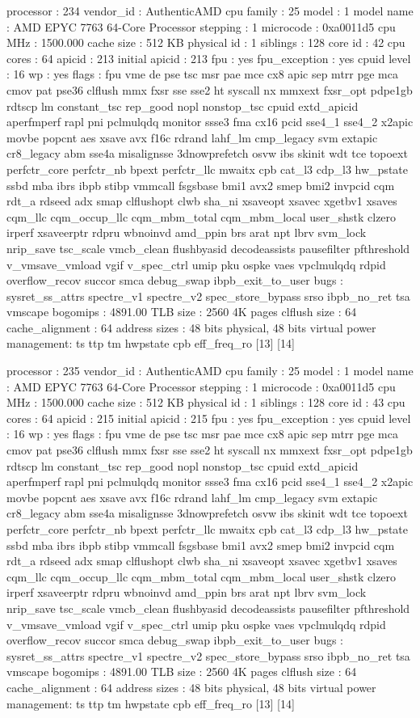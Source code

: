 processor	: 234
vendor_id	: AuthenticAMD
cpu family	: 25
model		: 1
model name	: AMD EPYC 7763 64-Core Processor
stepping	: 1
microcode	: 0xa0011d5
cpu MHz		: 1500.000
cache size	: 512 KB
physical id	: 1
siblings	: 128
core id		: 42
cpu cores	: 64
apicid		: 213
initial apicid	: 213
fpu		: yes
fpu_exception	: yes
cpuid level	: 16
wp		: yes
flags		: fpu vme de pse tsc msr pae mce cx8 apic sep mtrr pge mca cmov pat pse36 clflush mmx fxsr sse sse2 ht syscall nx mmxext fxsr_opt pdpe1gb rdtscp lm constant_tsc rep_good nopl nonstop_tsc cpuid extd_apicid aperfmperf rapl pni pclmulqdq monitor ssse3 fma cx16 pcid sse4_1 sse4_2 x2apic movbe popcnt aes xsave avx f16c rdrand lahf_lm cmp_legacy svm extapic cr8_legacy abm sse4a misalignsse 3dnowprefetch osvw ibs skinit wdt tce topoext perfctr_core perfctr_nb bpext perfctr_llc mwaitx cpb cat_l3 cdp_l3 hw_pstate ssbd mba ibrs ibpb stibp vmmcall fsgsbase bmi1 avx2 smep bmi2 invpcid cqm rdt_a rdseed adx smap clflushopt clwb sha_ni xsaveopt xsavec xgetbv1 xsaves cqm_llc cqm_occup_llc cqm_mbm_total cqm_mbm_local user_shstk clzero irperf xsaveerptr rdpru wbnoinvd amd_ppin brs arat npt lbrv svm_lock nrip_save tsc_scale vmcb_clean flushbyasid decodeassists pausefilter pfthreshold v_vmsave_vmload vgif v_spec_ctrl umip pku ospke vaes vpclmulqdq rdpid overflow_recov succor smca debug_swap ibpb_exit_to_user
bugs		: sysret_ss_attrs spectre_v1 spectre_v2 spec_store_bypass srso ibpb_no_ret tsa vmscape
bogomips	: 4891.00
TLB size	: 2560 4K pages
clflush size	: 64
cache_alignment	: 64
address sizes	: 48 bits physical, 48 bits virtual
power management: ts ttp tm hwpstate cpb eff_freq_ro [13] [14]

processor	: 235
vendor_id	: AuthenticAMD
cpu family	: 25
model		: 1
model name	: AMD EPYC 7763 64-Core Processor
stepping	: 1
microcode	: 0xa0011d5
cpu MHz		: 1500.000
cache size	: 512 KB
physical id	: 1
siblings	: 128
core id		: 43
cpu cores	: 64
apicid		: 215
initial apicid	: 215
fpu		: yes
fpu_exception	: yes
cpuid level	: 16
wp		: yes
flags		: fpu vme de pse tsc msr pae mce cx8 apic sep mtrr pge mca cmov pat pse36 clflush mmx fxsr sse sse2 ht syscall nx mmxext fxsr_opt pdpe1gb rdtscp lm constant_tsc rep_good nopl nonstop_tsc cpuid extd_apicid aperfmperf rapl pni pclmulqdq monitor ssse3 fma cx16 pcid sse4_1 sse4_2 x2apic movbe popcnt aes xsave avx f16c rdrand lahf_lm cmp_legacy svm extapic cr8_legacy abm sse4a misalignsse 3dnowprefetch osvw ibs skinit wdt tce topoext perfctr_core perfctr_nb bpext perfctr_llc mwaitx cpb cat_l3 cdp_l3 hw_pstate ssbd mba ibrs ibpb stibp vmmcall fsgsbase bmi1 avx2 smep bmi2 invpcid cqm rdt_a rdseed adx smap clflushopt clwb sha_ni xsaveopt xsavec xgetbv1 xsaves cqm_llc cqm_occup_llc cqm_mbm_total cqm_mbm_local user_shstk clzero irperf xsaveerptr rdpru wbnoinvd amd_ppin brs arat npt lbrv svm_lock nrip_save tsc_scale vmcb_clean flushbyasid decodeassists pausefilter pfthreshold v_vmsave_vmload vgif v_spec_ctrl umip pku ospke vaes vpclmulqdq rdpid overflow_recov succor smca debug_swap ibpb_exit_to_user
bugs		: sysret_ss_attrs spectre_v1 spectre_v2 spec_store_bypass srso ibpb_no_ret tsa vmscape
bogomips	: 4891.00
TLB size	: 2560 4K pages
clflush size	: 64
cache_alignment	: 64
address sizes	: 48 bits physical, 48 bits virtual
power management: ts ttp tm hwpstate cpb eff_freq_ro [13] [14]


